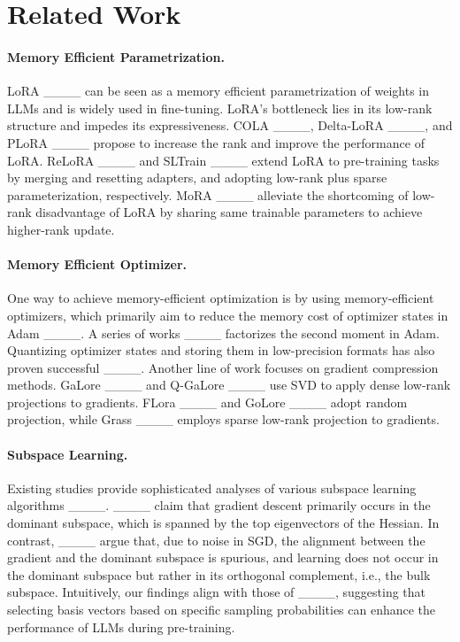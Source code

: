 \section{Related Work}
\label{sec:related-works}
\paragraph{Memory Efficient Parametrization.}
LoRA ____ can be seen as a memory efficient parametrization of weights in LLMs and is widely used in fine-tuning. LoRA's bottleneck lies in its low-rank structure and impedes its expressiveness. COLA ____, Delta-LoRA ____, and PLoRA ____ propose to increase the rank and improve the performance of LoRA. ReLoRA ____ and SLTrain ____ extend LoRA to pre-training tasks by merging and resetting adapters, and adopting low-rank plus sparse parameterization, respectively. MoRA ____ alleviate the shortcoming of low-rank disadvantage of LoRA by sharing same trainable parameters to achieve higher-rank update. 



\paragraph{Memory Efficient Optimizer.}
One way to achieve memory-efficient optimization is by using memory-efficient optimizers, which primarily aim to reduce the memory cost of optimizer states in Adam ____. A series of works ____ factorizes the second moment in Adam. Quantizing optimizer states and storing them in low-precision formats has also proven successful ____. Another line of work focuses on gradient compression methods. GaLore ____ and Q-GaLore ____ use SVD to apply dense low-rank projections to gradients. FLora ____ and GoLore ____ adopt random projection, while Grass ____ employs sparse low-rank projection to gradients.


\paragraph{Subspace Learning.}
Existing studies provide sophisticated analyses of various subspace learning algorithms ____. ____ claim that gradient descent primarily occurs in the dominant subspace, which is spanned by the top eigenvectors of the Hessian. In contrast, ____ argue that, due to noise in SGD, the alignment between the gradient and the dominant subspace is spurious, and learning does not occur in the dominant subspace but rather in its orthogonal complement, i.e., the bulk subspace. Intuitively, our findings align with those of ____, suggesting that selecting basis vectors based on specific sampling probabilities can enhance the performance of LLMs during pre-training.